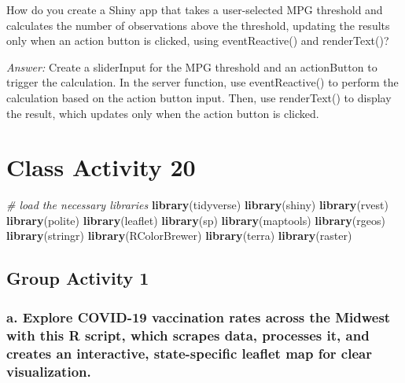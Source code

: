 \documentclass[
]{book}
\newenvironment{Shaded}{\begin{snugshade}}{\end{snugshade}}
\newcommand{\CommentTok}[1]{\textcolor[rgb]{0.56,0.35,0.01}{\textit{#1}}}
\newcommand{\FunctionTok}[1]{\textcolor[rgb]{0.13,0.29,0.53}{\textbf{#1}}}
\newcommand{\NormalTok}[1]{#1}
\begin{document}
How do you create a Shiny app that takes a user-selected MPG threshold and calculates the number of observations above the threshold, updating the results only when an action button is clicked, using eventReactive() and renderText()?

\emph{Answer:} Create a sliderInput for the MPG threshold and an actionButton to trigger the calculation. In the server function, use eventReactive() to perform the calculation based on the action button input. Then, use renderText() to display the result, which updates only when the action button is clicked.

\hypertarget{class-activity-20}{%
\chapter{Class Activity 20}\label{class-activity-20}}

\begin{Shaded}
\begin{Highlighting}[]
\CommentTok{\# load the necessary libraries}
\FunctionTok{library}\NormalTok{(tidyverse)}
\FunctionTok{library}\NormalTok{(shiny)}
\FunctionTok{library}\NormalTok{(rvest)}
\FunctionTok{library}\NormalTok{(polite)}
\FunctionTok{library}\NormalTok{(leaflet)}
\FunctionTok{library}\NormalTok{(sp)}
\FunctionTok{library}\NormalTok{(maptools)}
\FunctionTok{library}\NormalTok{(rgeos)}
\FunctionTok{library}\NormalTok{(stringr)}
\FunctionTok{library}\NormalTok{(RColorBrewer)}
\FunctionTok{library}\NormalTok{(terra)}
\FunctionTok{library}\NormalTok{(raster)}
\end{Highlighting}
\end{Shaded}

\hypertarget{group-activity-1-5}{%
\section{Group Activity 1}\label{group-activity-1-5}}

\hypertarget{a.-explore-covid-19-vaccination-rates-across-the-midwest-with-this-r-script-which-scrapes-data-processes-it-and-creates-an-interactive-state-specific-leaflet-map-for-clear-visualization.}{%
\subsection{a. Explore COVID-19 vaccination rates across the Midwest with this R script, which scrapes data, processes it, and creates an interactive, state-specific leaflet map for clear visualization.}\label{a.-explore-covid-19-vaccination-rates-across-the-midwest-with-this-r-script-which-scrapes-data-processes-it-and-creates-an-interactive-state-specific-leaflet-map-for-clear-visualization.}}
\end{document}
